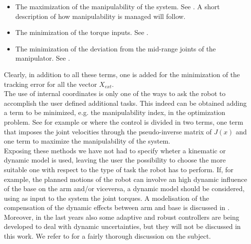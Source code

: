\begin{itemize}
	\item The maximization of the manipulability of the system. See \cite{yamamoto}. A short description of how manipulability is managed will follow.
	\item The minimization of the torque inputs. See \cite{chen1997dynamic}.
	\item The minimization of the deviation from the mid-range joints of the manipulator. See \cite{khatib1999}.
\end{itemize}
Clearly, in addition to all these terms, one is added for the minimization of the tracking error for all the vector $X_{ext}$.\\
The use of internal coordinates is only one of the ways to ask the robot to accomplish the user defined additional tasks. This indeed can be obtained adding a term to be minimized, e.g. the manipulability index, in the optimization problem. See for example \cite{bayle1} or \cite{bayle2} where the control is divided in two terms, one term that imposes the joint velocities  through the pseudo-inverse matrix of $J(x)$ and one term to maximize the manipulability of the system.\\
Exposing these methods we have not had to specify wheter a kinematic or dynamic model is used, leaving the user the possibility to choose the more suitable one with respect to the type of task the robot has to perform. If, for example, the planned motions of the robot can involve an high dynamic influence of the base on the arm and/or viceversa, a dynamic model should be considered, using as input to the system the joint torques. A modelisation of the compensation of the dynamic effects between arm and base is discussed in \cite{yamamoto1}.
Moreover, in the last years also some adaptive and robust controllers are being developed to deal with dynamic uncertainties, but they will not be discussed in this work. We refer to \cite{libromobilemanipulators} for a fairly thorough discussion on the subject.


